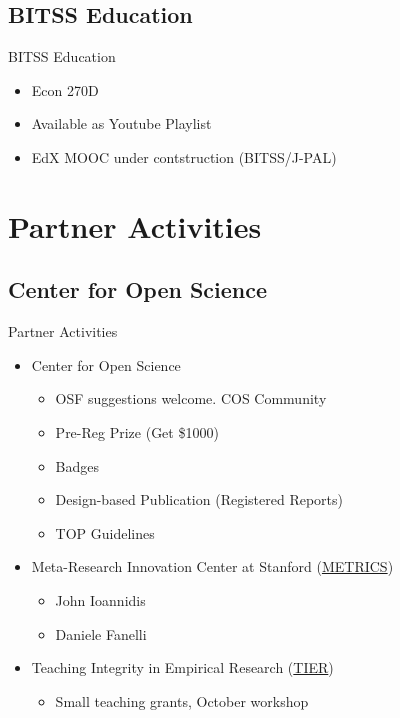 \documentclass{beamer}
\begin{document}
\subsection{BITSS Education}
\begin{frame} {BITSS Education}
\begin{itemize}
\item Econ 270D
\item Available as Youtube Playlist \href{https://www.youtube.com/playlist?list=PL-XXv-cvA_iBN9JZND3CF91aouSHH9ksB}{}
\item EdX MOOC under contstruction (BITSS/J-PAL)
\end{itemize}
\end{frame}
\section{Partner Activities}
\subsection{Center for Open Science}
\begin{frame}{Partner Activities}
\begin{itemize}
 \item Center for Open Science
	\begin{itemize}
 	\item OSF suggestions welcome. COS Community \href{http://centerforopenscience.org/involved_participate/}{}
 	\item Pre-Reg Prize (Get \$1000) \href{http://centerforopenscience.org/prereg/}{}
 	\item Badges
 	\item Design-based Publication (Registered Reports)
 	\item TOP Guidelines
 	\end{itemize}
\item Meta-Research Innovation Center at Stanford (\href{http://metrics.stanford.edu}{METRICS}) 
	\begin{itemize}
	\item John Ioannidis
	\item Daniele Fanelli
	\end{itemize}
\item Teaching Integrity in Empirical Research (\href{http://www.haverford.edu/TIER/}{TIER})
	\begin{itemize}
	\item Small teaching grants, October workshop \href{http://www.haverford.edu/TIER/fellowships_workshops/workshop_fall_2015.php}{}
	\end{itemize}
\end{itemize}
\end{frame}
\end{document}
